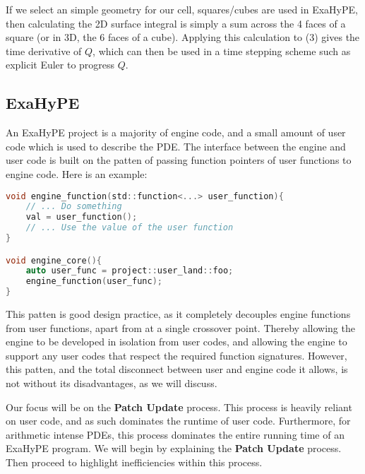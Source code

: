 If we select an simple geometry for our cell, squares/cubes are used in ExaHyPE, then calculating the 2D surface integral is simply a sum across the 4 faces of a square (or in 3D, the 6 faces of a cube).
Applying this calculation to (3) gives the time derivative of $Q$, which can then be used in a time stepping scheme such as explicit Euler to progress $Q$.

\subsection{ExaHyPE}


\newcommand{\proc}[1]{\textbf{#1}}

An ExaHyPE project is a majority of engine code, and a small amount of user code which is used to describe the PDE.
The interface between the engine and user code is built on the patten of passing function pointers of user functions to engine code.
Here is an example:
\begin{lstlisting}[language=c]
void engine_function(std::function<...> user_function){
    // ... Do something
    val = user_function();
    // ... Use the value of the user function 
}

void engine_core(){
    auto user_func = project::user_land::foo;
    engine_function(user_func);
}
\end{lstlisting}

This patten is good design practice, as it completely decouples engine functions from user functions, apart from at a single crossover point.
Thereby allowing the engine to be developed in isolation from user codes, and allowing the engine to support any user codes that respect the required function signatures.
However, this patten, and the total disconnect between user and engine code it allows, is not without its disadvantages, as we will discuss.

Our focus will be on the \proc{Patch Update} process.
This process is heavily reliant on user code, and as such dominates the runtime of user code.
Furthermore, for arithmetic intense PDEs, this process dominates the entire running time of an ExaHyPE program.
We will begin by explaining the \proc{Patch Update} process.
Then proceed to highlight inefficiencies within this process. 

